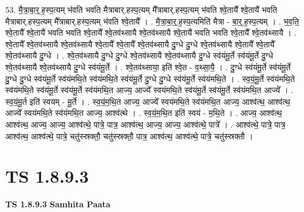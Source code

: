 \documentclass[17pt]{extarticle}
\begin{document}
53. मै॒त्रा॒बा॒र्॒.ह॒स्प॒त्यम् भ॑वति भवति मैत्राबार्.हस्प॒त्यम् मै᳚त्राबार्.हस्प॒त्यम् भ॑वति श्वे॒तायै᳚ श्वे॒तायै॑ भवति मैत्राबार्.हस्प॒त्यम् मै᳚त्राबार्.हस्प॒त्यम् भ॑वति श्वे॒तायै᳚ । . मै॒त्रा॒बा॒र्॒.ह॒स्प॒त्यमिति॑ मैत्रा - बा॒र्॒.ह॒स्प॒त्यम् । . भ॒व॒ति॒ श्वे॒तायै᳚ श्वे॒तायै॑ भवति भवति श्वे॒तायै᳚ श्वे॒तव॑थ्सायै श्वे॒तव॑थ्सायै श्वे॒तायै॑ भवति भवति श्वे॒तायै᳚ श्वे॒तव॑थ्सायै । . श्वे॒तायै᳚ श्वे॒तव॑थ्सायै श्वे॒तव॑थ्सायै श्वे॒तायै᳚ श्वे॒तायै᳚ श्वे॒तव॑थ्सायै दु॒ग्धे दु॒ग्धे श्वे॒तव॑थ्सायै श्वे॒तायै᳚ श्वे॒तायै᳚ श्वे॒तव॑थ्सायै दु॒ग्धे । . श्वे॒तव॑थ्सायै दु॒ग्धे दु॒ग्धे श्वे॒तव॑थ्सायै श्वे॒तव॑थ्सायै दु॒ग्धे स्व॑यंमू॒र्ते स्व॑यंमू॒र्ते दु॒ग्धे श्वे॒तव॑थ्सायै श्वे॒तव॑थ्सायै दु॒ग्धे स्व॑यंमू॒र्ते । . श्वे॒तव॑थ्साया॒ इति॑ श्वे॒त - व॒थ्सा॒यै॒ । . दु॒ग्धे स्व॑यंमू॒र्ते स्व॑यंमू॒र्ते दु॒ग्धे दु॒ग्धे स्व॑यंमू॒र्ते स्व॑यंमथि॒ते स्व॑यंमथि॒ते स्व॑यंमू॒र्ते दु॒ग्धे दु॒ग्धे स्व॑यंमू॒र्ते स्व॑यंमथि॒ते । . स्व॒यं॒मू॒र्ते स्व॑यंमथि॒ते स्व॑यंमथि॒ते स्व॑यंमू॒र्ते स्व॑यंमू॒र्ते स्व॑यंमथि॒त आज्य॒ आज्ये᳚ स्वयंमथि॒ते स्व॑यंमू॒र्ते स्व॑यंमू॒र्ते स्व॑यंमथि॒त आज्ये᳚ । . स्व॒यं॒मू॒र्त इति॑ स्वयम् - मू॒र्ते । . स्व॒यं॒म॒थि॒त आज्य॒ आज्ये᳚ स्वयंमथि॒ते स्व॑यंमथि॒त आज्य॒ आश्व॑त्थ॒ आश्व॑त्थ॒ आज्ये᳚ स्वयंमथि॒ते स्व॑यंमथि॒त आज्य॒ आश्व॑त्थे । . स्व॒यं॒म॒थि॒त इति॑ स्वयं - म॒थि॒ते । . आज्य॒ आश्व॑त्थ॒ आश्व॑त्थ॒ आज्य॒ आज्य॒ आश्व॑त्थे॒ पात्रे॒ पात्र॒ आश्व॑त्थ॒ आज्य॒ आज्य॒ आश्व॑त्थे॒ पात्रे᳚ । . आश्व॑त्थे॒ पात्रे॒ पात्र॒ आश्व॑त्थ॒ आश्व॑त्थे॒ पात्रे॒ चतु॑स्स्रक्तौ॒ चतु॑स्स्रक्तौ॒ पात्र॒ आश्व॑त्थ॒ आश्व॑त्थे॒ पात्रे॒ चतु॑स्स्रक्तौ । \newline
\pagebreak
{}

\section{ TS 1.8.9.3 }

\textbf{TS 1.8.9.3 } \newline
\textbf{Samhita Paata} \newline
\end{document}
